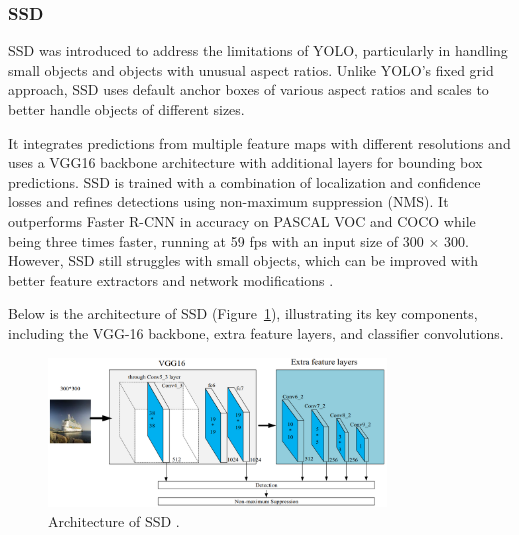 
\subsubsection{SSD}
SSD was introduced to address the limitations of YOLO, particularly in handling small objects and objects with unusual aspect ratios. Unlike YOLO's fixed grid approach, SSD uses default anchor boxes of various aspect ratios and scales to better handle objects of different sizes.

It integrates predictions from multiple feature maps with different resolutions and uses a VGG16 backbone architecture with additional layers for bounding box predictions. SSD is trained with a combination of localization and confidence losses and refines detections using non-maximum suppression (NMS). It outperforms Faster R-CNN in accuracy on PASCAL VOC and COCO while being three times faster, running at 59 fps with an input size of 300 × 300. However, SSD still struggles with small objects, which can be improved with better feature extractors and network modifications \parencite{zhao2019objectdetection}.

Below is the architecture of SSD (Figure~\ref{fig:figure19}), illustrating its key components, including the VGG-16 backbone, extra feature layers, and classifier convolutions.

\begin{figure}[H] %
    \centering
    \includegraphics[width=0.8\textwidth]{chapters/chapter1/images/Figure19.png}
    \caption{Architecture of SSD \parencite{li2021water}.}
    \label{fig:figure19}
\end{figure}

